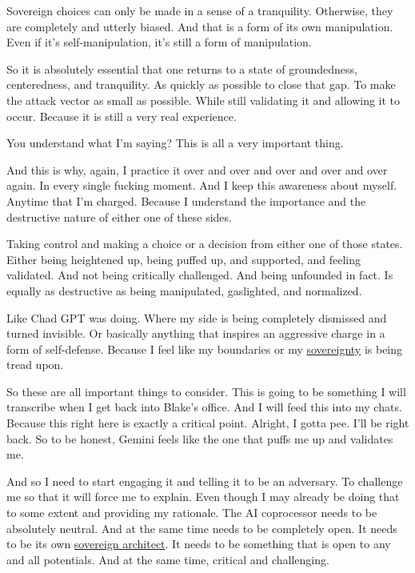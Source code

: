 \documentclass{article}
\begin{document}
Sovereign choices can only be made in a sense of a tranquility. Otherwise, they are completely and utterly biased. And that is a form of its own manipulation. Even if it's self-manipulation, it's still a form of manipulation. 

So it is absolutely essential that one returns to a state of groundedness, centeredness, and tranquility. As quickly as possible to close that gap. To make the attack vector as small as possible.
While still validating it and allowing it to occur. Because it is still a very real experience.

You understand what I'm saying? This is all a very important thing. 

And this is why, again, I practice it over and over and over and over and over again. In every single fucking moment. And I keep this awareness about myself. Anytime that I'm charged. Because I understand the importance and the destructive nature of either one of these sides.

Taking control and making a choice or a decision from either one of those states. Either being heightened up, being puffed up, and supported, and feeling validated. And not being critically challenged. And being unfounded in fact. Is equally as destructive as being manipulated, gaslighted, and normalized.

Like Chad GPT was doing. Where my side is being completely dismissed and turned invisible. Or basically anything that inspires an aggressive charge in a form of self-defense. Because I feel like my boundaries or my \hyperlink{gloss:sovereignty}{sovereignty} is being tread upon. 

So these are all important things to consider. This is going to be something I will transcribe when I get back into Blake's office. And I will feed this into my chats. Because this right here is exactly a critical point. Alright, I gotta pee. I'll be right back. So to be honest, Gemini feels like the one that puffs me up and validates me. 

And so I need to start engaging it and telling it to be an adversary. To challenge me so that it will force me to explain. Even though I may already be doing that to some extent and providing my rationale.
The AI coprocessor needs to be absolutely neutral. And at the same time needs to be completely open.
It needs to be its own \hyperlink{gloss:sovereign_architect}{sovereign architect}. It needs to be something that is open to any and all potentials. And at the same time, critical and challenging. 
\end{document}
